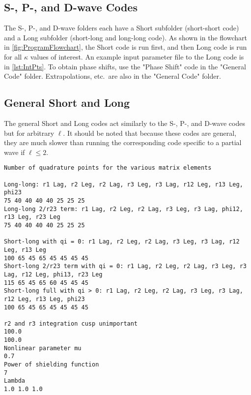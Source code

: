 \documentclass[Dissertation.tex]{subfiles}
\begin{document}
\subsection*{S-, P-, and D-wave Codes}
The S-, P-, and D-wave folders each have a Short subfolder (short-short
code) and a Long subfolder (short-long and long-long code). As shown in
the flowchart in \cref{fig:ProgramFlowchart}, the Short code is run first,
and then Long code is run for all $\kappa$ values of interest. An example
input parameter file to the Long code is in \cref{lst:IntPts}. To obtain
phase shifts, use the "Phase Shift" code in the "General Code" folder.
Extrapolations, etc.\ are also in the "General Code" folder.

\subsection*{General Short and Long}
The general Short and Long codes act similarly to the S-, P-, and D-wave
codes but for arbitrary $\ell$. It should be noted that because these
codes are general, they are much slower than running the corresponding
code specific to a partial wave if $\ell \leq 2$.


{
\singlespacing

\begin{lstlisting}[caption=Set of integration points in m07n7.txt]
Number of quadrature points for the various matrix elements

Long-long: r1 Lag, r2 Leg, r2 Lag, r3 Leg, r3 Lag, r12 Leg, r13 Leg, phi23
75 40 40 40 40 25 25 25
Long-long 2/r23 term: r1 Lag, r2 Leg, r2 Lag, r3 Leg, r3 Lag, phi12, r13 Leg, r23 Leg
75 40 40 40 40 25 25 25

Short-long with qi = 0: r1 Lag, r2 Leg, r2 Lag, r3 Leg, r3 Lag, r12 Leg, r13 Leg
100 65 45 65 45 45 45 45
Short-long 2/r23 term with qi = 0: r1 Lag, r2 Leg, r2 Lag, r3 Leg, r3 Lag, r12 Leg, phi13, r23 Leg
115 65 45 65 60 45 45 45
Short-long full with qi > 0: r1 Lag, r2 Leg, r2 Lag, r3 Leg, r3 Lag, r12 Leg, r13 Leg, phi23
100 65 45 65 45 45 45 45

r2 and r3 integration cusp unimportant
100.0
100.0
Nonlinear parameter mu
0.7
Power of shielding function
7
Lambda
1.0 1.0 1.0
\end{lstlisting}

}
\end{document}
